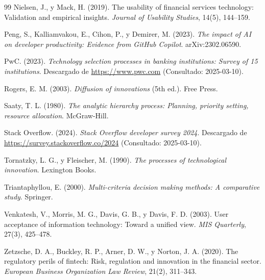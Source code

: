 \begin{thebibliography}{99}
 Nielsen, J., y Mack, H. (2019). The usability of financial services technology: Validation and empirical insights. \textit{Journal of Usability Studies}, 14(5), 144--159.

 Peng, S., Kalliamvakou, E., Cihon, P., y Demirer, M. (2023). \textit{The impact of AI on developer productivity: Evidence from GitHub Copilot}. arXiv:2302.06590.

 PwC. (2023). \textit{Technology selection processes in banking institutions: Survey of 15 institutions}. Descargado de \url{https://www.pwc.com} (Consultado: 2025-03-10).

 Rogers, E. M. (2003). \textit{Diffusion of innovations} (5th ed.). Free Press.

 Saaty, T. L. (1980). \textit{The analytic hierarchy process: Planning, priority setting, resource allocation}. McGraw-Hill.

 Stack Overflow. (2024). \textit{Stack Overflow developer survey 2024}. Descargado de \url{https://survey.stackoverflow.co/2024} (Consultado: 2025-03-10).

 Tornatzky, L. G., y Fleischer, M. (1990). \textit{The processes of technological innovation}. Lexington Books.

 Triantaphyllou, E. (2000). \textit{Multi-criteria decision making methods: A comparative study}. Springer.

 Venkatesh, V., Morris, M. G., Davis, G. B., y Davis, F. D. (2003). User acceptance of information technology: Toward a unified view. \textit{MIS Quarterly}, 27(3), 425--478.

 Zetzsche, D. A., Buckley, R. P., Arner, D. W., y Norton, J. A. (2020). The regulatory perils of fintech: Risk, regulation and innovation in the financial sector. \textit{European Business Organization Law Review}, 21(2), 311--343.

\end{thebibliography}
